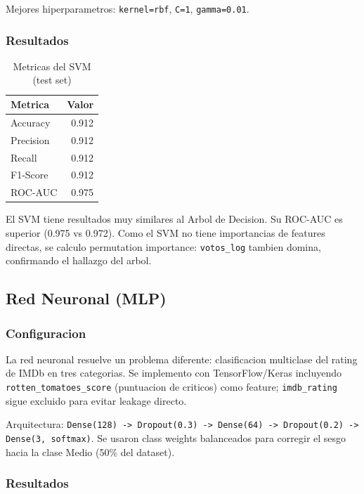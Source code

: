 \documentclass[12pt, a4paper]{article}
\begin{document}
Mejores hiperparametros: \texttt{kernel=rbf}, \texttt{C=1}, \texttt{gamma=0.01}.

\subsubsection{Resultados}

\begin{table}[H]
\centering
\caption{Metricas del SVM (test set)}
\begin{tabular}{lr}
\toprule
\textbf{Metrica} & \textbf{Valor} \\
\midrule
Accuracy    & 0.912 \\
Precision   & 0.912 \\
Recall      & 0.912 \\
F1-Score    & 0.912 \\
ROC-AUC     & 0.975 \\
\bottomrule
\end{tabular}
\end{table}

El SVM tiene resultados muy similares al Arbol de Decision. Su ROC-AUC es superior (0.975 vs 0.972). Como el SVM no tiene importancias de features directas, se calculo permutation importance: \texttt{votos\_log} tambien domina, confirmando el hallazgo del arbol.

\subsection{Red Neuronal (MLP)}

\subsubsection{Configuracion}

La red neuronal resuelve un problema diferente: clasificacion multiclase del rating de IMDb en tres categorias. Se implemento con TensorFlow/Keras incluyendo \texttt{rotten\_tomatoes\_score} (puntuacion de criticos) como feature; \texttt{imdb\_rating} sigue excluido para evitar leakage directo.

Arquitectura: \texttt{Dense(128) -> Dropout(0.3) -> Dense(64) -> Dropout(0.2) -> Dense(3, softmax)}. Se usaron class weights balanceados para corregir el sesgo hacia la clase Medio (50\% del dataset).

\subsubsection{Resultados}
\end{document}

